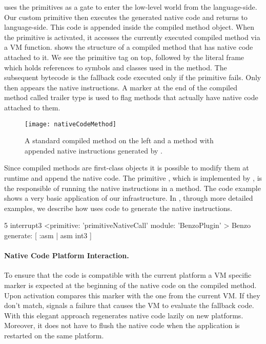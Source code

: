 \B uses the primitives as a gate to enter the low-level world from the language-side.
Our custom primitive then executes the generated native code and returns to language-side. 
This code is appended inside the compiled method object.
When the primitive is activated, it  accesses the currently executed compiled method via a VM function. 
 shows the structure of a \ST compiled method that has native code attached to it.
We see the primitive tag on top, followed by the literal frame which holds references to symbols and classes used in the method.
The subsequent \ST bytecode is the fallback code executed only if the primitive fails. Only then appears the native instructions.
A marker at the end of the compiled method called trailer type is used to flag methods that actually have native code attached to them.
%
\begin{figure}[ht]
	\centering
	\texttt{[image: nativeCodeMethod]}
	\caption[\PH Compiled Method]{A standard \PH compiled method on the left and a method with appended native instructions generated by \B.}
\end{figure}

Since compiled methods are first-class objects it is possible to modify them at runtime and append the native code.
The primitive , which is implemented by \B, is the responsible of running the native instructions in a \ST method.
The code example  shows a very basic application of our infrastructure.
In , through more detailed examples, we describe how \B uses \ST code to generate the native instructions.
%
\begin{stcode}[label={lst:basic-native-code}, caption={\ST method using \B for very basic low-level debugging.}, escapeinside={@}{@}]{5}
interrupt3
	<primitive: 'primitiveNativeCall' 
	 module: 'BenzoPlugin' >
	Benzo generate: [ :asm | asm int3 ]
\end{stcode}

\paragraph{Native Code Platform Interaction.}

To ensure that the code is compatible with the current platform a VM specific marker is expected at the beginning of the native code on the compiled method.
Upon activation \B compares this marker with the one from the current VM.
If they don't match, \B signals a failure that causes the VM to evaluate the fallback \ST code.
With this elegant approach \B regenerates native code lazily on new platforms.
Moreover, it does not have to flush the native code when the application is restarted on the same platform.


